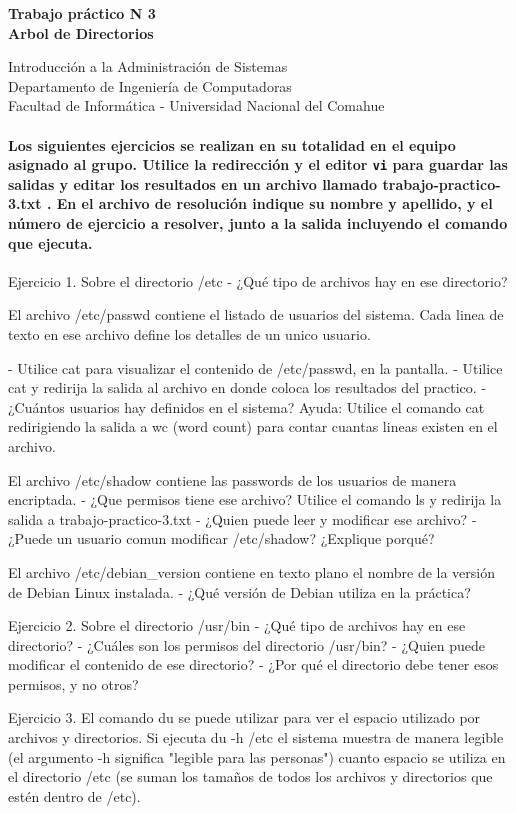 \documentclass[12pt]{article}
\def\maketitle{

 \makeatletter
 {\color{bl} \centering \huge \sc \textbf{
Trabajo práctico N 3 \\
\large \vspace*{-8pt} \color{black} Arbol de Directorios
 \vspace*{8pt} }\par}
 \makeatother


 \makeatletter
 {\centering \small 
	Introducción a la Administración de Sistemas \\
 	Departamento de Ingeniería de Computadoras \\
 	Facultad de Informática - Universidad Nacional del Comahue \\
 	\vspace{20pt} }
 \makeatother

}
\begin{document}
\thispagestyle{empty}
\maketitle
\setlength{\parindent}{0pt}

\paragraph{Los siguientes ejercicios se realizan en su totalidad en el equipo asignado al grupo.
Utilice la redirección y el editor \texttt{vi} para guardar las salidas y editar los resultados 
en un archivo llamado trabajo-practico-3.txt . En el archivo de resolución indique su nombre y apellido, y el número de ejercicio a resolver, junto a la salida incluyendo el comando que ejecuta. }

Ejercicio 1.
Sobre el directorio /etc
- ¿Qué tipo de archivos hay en ese directorio?

El archivo /etc/passwd contiene el listado de usuarios del sistema.
Cada linea de texto en ese archivo define los detalles de un unico usuario.

- Utilice cat para visualizar el contenido de /etc/passwd, en la pantalla.
- Utilice cat y redirija la salida al archivo en donde coloca los resultados del practico.
- ¿Cuántos usuarios hay definidos en el sistema?
Ayuda: Utilice el comando cat redirigiendo la salida a wc (word count) para contar cuantas lineas
existen en el archivo.


El archivo /etc/shadow contiene las passwords de los usuarios de manera encriptada.
- ¿Que permisos tiene ese archivo? Utilice el comando ls y redirija la salida a trabajo-practico-3.txt
- ¿Quien puede leer y modificar ese archivo?
- ¿Puede un usuario comun modificar /etc/shadow? ¿Explique porqué?


El archivo /etc/debian_version contiene en texto plano el nombre de la
versión de Debian Linux instalada.
- ¿Qué versión de Debian utiliza en la práctica?


Ejercicio 2.
Sobre el directorio /usr/bin
- ¿Qué tipo de archivos hay en ese directorio?
- ¿Cuáles son los permisos del directorio /usr/bin?
- ¿Quien puede modificar el contenido de ese directorio?
- ¿Por qué el directorio debe tener esos permisos, y no otros?


Ejercicio 3.
El comando du se puede utilizar para ver el espacio utilizado por archivos y directorios.
Si ejecuta du -h /etc el sistema muestra de manera legible (el argumento -h significa "legible para las personas")
cuanto espacio se utiliza en el directorio /etc (se suman los tamaños de todos los archivos y directorios que estén dentro de /etc).
\end{document}
